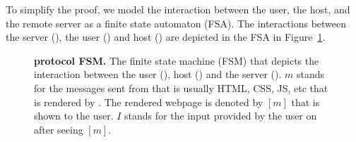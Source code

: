 

To simplify the proof, we model the interaction between the user, the host, and the remote server as a finite state automaton (FSA).
The interactions between the server (\server), the user (\user) and host (\host) are depicted in the FSA in Figure~\ref{fig:fsm}.

\begin{figure}[h!]
\begin{center}
\end{center}
\caption[\name protocol FSM]{\textbf{\name protocol FSM.} The finite state machine (FSM) that depicts the interaction between the user (\user), host (\host) and the server (\server). $m$ stands for the messages sent from \server that is usually HTML, CSS, JS, etc that is rendered by \host. The rendered webpage is denoted by $[m]$ that is shown to the user. $I$ stands for the input provided by the user on \host after seeing $[m]$.}
\label{fig:fsm}
\end{figure}


